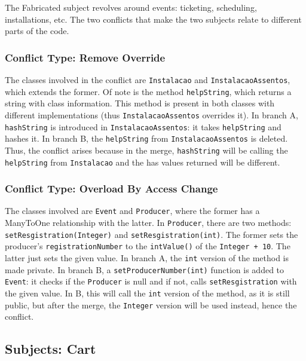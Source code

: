 The Fabricated subject revolves around events: ticketing, scheduling, installations, etc. The two
conflicts that make the two subjects relate to different parts of the code.

\subsubsection{Conflict Type: Remove Override}

The classes involved in the conflict are \texttt{Instalacao} and \texttt{InstalacaoAssentos}, which extends the former.
Of note is the method \texttt{helpString}, which returns a string with class information.  This method is present
in both classes with different implementations (thus \texttt{InstalacaoAssentos} overrides it). In branch A,
\texttt{hashString} is introduced in \texttt{InstalacaoAssentos}: it takes \texttt{helpString} and hashes it. In branch B,
the \texttt{helpString} from \texttt{InstalacaoAssentos} is deleted. Thus, the conflict arises because in the merge,
\texttt{hashString} will be calling the \texttt{helpString} from \texttt{Instalacao} and the has values returned will be different.

\subsubsection{Conflict Type: Overload By Access Change}

The classes involved are \texttt{Event} and \texttt{Producer}, where the former has a ManyToOne relationship with the latter.
In \texttt{Producer}, there are two methods: \texttt{setResgistration(Integer)} and \texttt{setResgistration(int)}. The former sets
the producer's \texttt{registrationNumber} to the \texttt{intValue()} of the \texttt{Integer + 10}. The latter just sets the given value.
In branch A, the \texttt{int} version of the method is made private. In branch B, a \texttt{setProducerNumber(int)} function is added
to \texttt{Event}: it checks if the \texttt{Producer} is null and if not, calls \texttt{setResgistration} with the given value. In B, this will
call the \texttt{int} version of the method, as it is still public, but after the merge, the \texttt{Integer} version will be used instead,
hence the conflict.

\subsection{Subjects: Cart}

